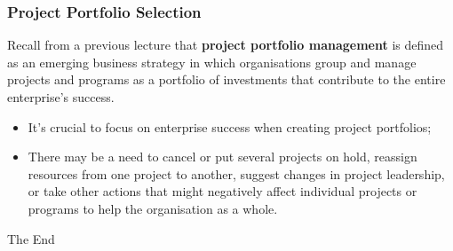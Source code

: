 \documentclass{beamer}
\begin{document}
\begin{frame}
\frametitle{Project Portfolio Selection}
Recall from a previous lecture that \textbf{project portfolio management} is defined as an emerging business strategy in which organisations group and manage projects and programs as a portfolio of investments that contribute to the entire enterprise's success.
\begin{figure}
\end{figure}
\begin{itemize}
\item It's crucial to focus on enterprise success when creating project portfolios;
\item There may be a need to cancel or put several projects on hold, reassign resources from one project to another, suggest changes in project leadership, or take other actions that might negatively affect individual projects or programs to help the organisation as a whole.
\end{itemize}
\end{frame}
\begin{frame}
\begin{center}
\huge The End
\end{center}
\end{frame}
\end{document}
